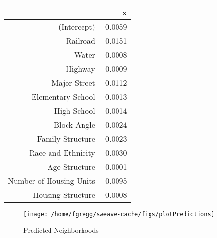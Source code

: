 \documentclass[12pt,letter]{article}\usepackage[]{graphicx}\usepackage[]{color}
\makeatletter
\def\maxwidth{ %
  \ifdim\Gin@nat@width>\linewidth
    \linewidth
  \else
    \Gin@nat@width
  \fi
}
\newenvironment{knitrout}{}{} %
\makeatother
\begin{document}
\begin{table}[ht]
\centering
\begin{tabular}{rr}
  \hline
 & x \\ 
  \hline
(Intercept) & -0.0059 \\ 
  Railroad & 0.0151 \\ 
  Water & 0.0008 \\ 
  Highway & 0.0009 \\ 
  Major Street & -0.0112 \\ 
  Elementary School & -0.0013 \\ 
  High School & 0.0014 \\ 
  Block Angle & 0.0024 \\ 
  Family Structure & -0.0023 \\ 
  Race and Ethnicity & 0.0030 \\ 
  Age Structure & 0.0001 \\ 
  Number of Housing Units & 0.0095 \\ 
  Housing Structure & -0.0008 \\ 
   \hline
\end{tabular}
\end{table}




\begin{figure}
\begin{knitrout}
\color{fgcolor}

{\centering \texttt{[image: /home/fgregg/sweave-cache/figs/plotPredictions]} 

}



\end{knitrout}

\caption{Predicted Neighborhoods}
\end{figure}



\end{document}
